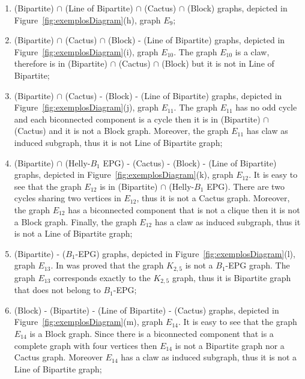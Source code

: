 \begin{enumerate}[label=(\arabic*)]
    \item (Bipartite) $\cap$ (Line of Bipartite) $\cap$  (Cactus) $\cap$ (Block) graphs, depicted in Figure~\ref{fig:exemplosDiagram}(h), graph $E_9$;%
  \item (Bipartite) $\cap$  (Cactus) $\cap$ (Block) - (Line of Bipartite) graphs, depicted in Figure~\ref{fig:exemplosDiagram}(i), graph $E_{10}$. The graph $E_{10}$ is a claw, therefore is in (Bipartite) $\cap$  (Cactus) $\cap$ (Block) but it is not in Line of Bipartite;%
    \item (Bipartite)  $\cap$  (Cactus) - (Block) -  (Line of Bipartite) graphs, depicted in Figure~\ref{fig:exemplosDiagram}(j), graph $E_{11}$. The graph $E_{11}$ has no odd cycle and each biconnected component is a cycle then it is in (Bipartite)  $\cap$  (Cactus) and it is not a Block graph. Moreover, the graph $E_{11}$ has claw as induced subgraph, thus it is not Line of Bipartite graph;%
     \item (Bipartite) $\cap$ (Helly-$B_1$ EPG) - (Cactus) - (Block) -  (Line of Bipartite) graphs, depicted in Figure~\ref{fig:exemplosDiagram}(k), graph $E_{12}$. It is easy to see that the graph $E_{12}$ is in (Bipartite) $\cap$ (Helly-$B_1$ EPG). There are two cycles sharing two vertices in $E_{12}$, thus it is not a Cactus graph. Moreover, the graph $E_{12}$ has a biconnected component that is not a clique then it is not a Block graph. Finally, the graph $E_{12}$ has a claw as induced subgraph, thus it is not a Line of Bipartite graph;%
      \item (Bipartite) - ($B_1$-EPG) graphs, depicted in Figure~\ref{fig:exemplosDiagram}(l), graph $E_{13}$. In \citeauthor{cohen2014} \cite{cohen2014} was proved that the graph $K_{2,5}$ is not a $B_1$-EPG graph. The graph $E_{13}$ corresponds exactly to the $K_{2,5}$ graph, thus it is Bipartite graph that does not belong to $B_1$-EPG;%
      \item (Block) - (Bipartite) - (Line of Bipartite)  - (Cactus) graphs, depicted in Figure~\ref{fig:exemplosDiagram}(m), graph $E_{14}$. It is easy to see that the graph $E_{14}$ is a Block graph. Since there is a biconnected component that is a complete graph with four vertices then $E_{14}$ is not a Bipartite graph nor a Cactus graph. Moreover $E_{14}$ has a claw as induced subgraph, thus it is not a Line of Bipartite graph;%
 

\end{enumerate}
